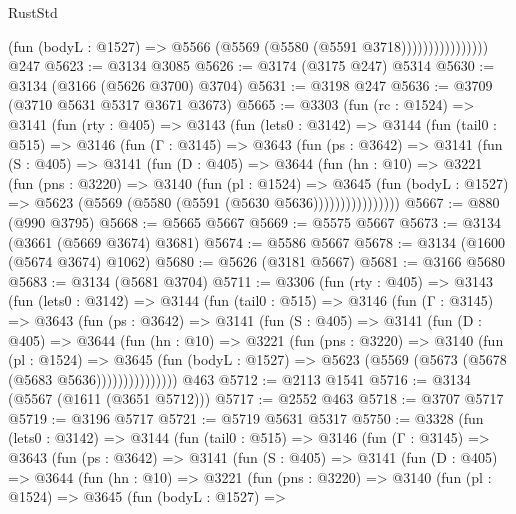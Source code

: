 \begin{lexlean}{RustStd}
\begin{coremodule}
                            (fun (bodyL : @1527) => @5566 (@5569 (@5580 (@5591 @3718))))))))))))))))
    @247
@5623 := @3134 @3085
@5626 := @3174 (@3175 @247) @5314
@5630 := @3134 (@3166 (@5626 @3700) @3704)
@5631 := @3198 @247
@5636 := @3709 (@3710 @5631 @5317 @3671 @3673)
@5665 := @3303
    (fun (rc : @1524) =>
    @3141
      (fun (rty : @405) =>
      @3143
        (fun (lets0 : @3142) =>
        @3144
          (fun (tail0 : @515) =>
          @3146
            (fun (Γ : @3145) =>
            @3643
              (fun (ps : @3642) =>
              @3141
                (fun (S : @405) =>
                @3141
                  (fun (D : @405) =>
                  @3644
                    (fun (hn : @10) =>
                    @3221
                      (fun (pns : @3220) =>
                      @3140
                        (fun (pl : @1524) =>
                        @3645
                          (fun (bodyL : @1527) =>
                          @5623 (@5569 (@5580 (@5591 (@5630 @5636))))))))))))))))
@5667 := @880 (@990 @3795)
@5668 := @5665 @5667
@5669 := @5575 @5667
@5673 := @3134 (@3661 (@5669 @3674) @3681)
@5674 := @5586 @5667
@5678 := @3134 (@1600 (@5674 @3674) @1062)
@5680 := @5626 (@3181 @5667)
@5681 := @3166 @5680
@5683 := @3134 (@5681 @3704)
@5711 := @3306
    (fun (rty : @405) =>
    @3143
      (fun (lets0 : @3142) =>
      @3144
        (fun (tail0 : @515) =>
        @3146
          (fun (Γ : @3145) =>
          @3643
            (fun (ps : @3642) =>
            @3141
              (fun (S : @405) =>
              @3141
                (fun (D : @405) =>
                @3644
                  (fun (hn : @10) =>
                  @3221
                    (fun (pns : @3220) =>
                    @3140
                      (fun (pl : @1524) =>
                      @3645
                        (fun (bodyL : @1527) =>
                        @5623 (@5569 (@5673 (@5678 (@5683 @5636)))))))))))))))
    @463
@5712 := @2113 @1541
@5716 := @3134 (@5567 (@1611 (@3651 @5712)))
@5717 := @2552 @463
@5718 := @3707 @5717
@5719 := @3196 @5717
@5721 := @5719 @5631 @5317
@5750 := @3328
    (fun (lets0 : @3142) =>
    @3144
      (fun (tail0 : @515) =>
      @3146
        (fun (Γ : @3145) =>
        @3643
          (fun (ps : @3642) =>
          @3141
            (fun (S : @405) =>
            @3141
              (fun (D : @405) =>
              @3644
                (fun (hn : @10) =>
                @3221
                  (fun (pns : @3220) =>
                  @3140
                    (fun (pl : @1524) =>
                    @3645
                      (fun (bodyL : @1527) =>

\end{coremodule}
\end{lexlean}

